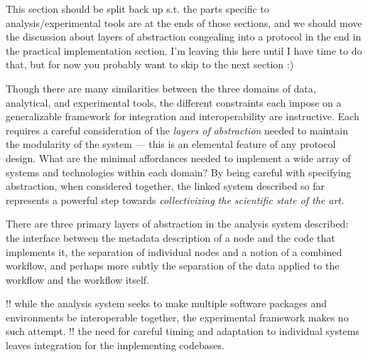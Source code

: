 \documentclass[notoc]{tufte-book}
\begin{document}
This section should be split back up s.t. the parts specific to
analysis/experimental tools are at the ends of those sections, and we
should move the discussion about layers of abstraction congealing into a
protocol in the end in the practical implementation section. I'm leaving
this here until I have time to do that, but for now you probably want to
skip to the next section :)

Though there are many similarities between the three domains of data,
analytical, and experimental tools, the different constraints each
impose on a generalizable framework for integration and interoperability
are instructive. Each requires a careful consideration of the
\emph{layers of abstraction} needed to maintain the modularity of the
system --- this is an elemental feature of any protocol design. What are
the minimal affordances needed to implement a wide array of systems and
technologies within each domain? By being careful with specifying
abstraction, when considered together, the linked system described so
far represents a powerful step towards \emph{collectivizing the
scientific state of the art.}

There are three primary layers of abstraction in the analysis system
described: the interface between the metadata description of a node and
the code that implements it, the separation of individual nodes and a
notion of a combined workflow, and perhaps more subtly the separation of
the data applied to the workflow and the workflow itself.

!! while the analysis system seeks to make multiple software packages
and environments be interoperable together, the experimental framework
makes no such attempt. !! the need for careful timing and adaptation to
individual systems leaves integration for the implementing codebases.
\end{document}
